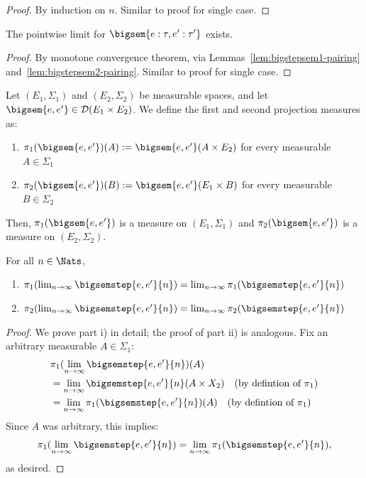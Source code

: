 \begin{proof}
	By induction on $n$. Similar to proof for single case.
\end{proof}

\begin{lemma}\label{lem:limit-exists-2}
	The pointwise limit for $\bigsem{e : \tau, e' : \tau'}$ exists.
\end{lemma}

\begin{proof}
	By monotone convergence theorem, via Lemmas~\ref{lem:bigstepsem1-pairing} and~\ref{lem:bigstepsem2-pairing}. Similar to proof for single case.
\end{proof}

\begin{definition}
	Let $(E_1, \Sigma_1)$ and $(E_2, \Sigma_2)$ be measurable spaces, and let $\bigsem{e,e'} \in \mathcal{D}(E_1 \times E_2)$. We define the first and second projection measures as:
	\begin{enumerate}
		\item $\pi_1(\bigsem{e,e'})(A) := \bigsem{e,e'}(A \times E_2)$ for every measurable $A \in \Sigma_1$
		\item $\pi_2(\bigsem{e,e'})(B) := \bigsem{e,e'}(E_1 \times B)$ for every measurable $B \in \Sigma_2$
	\end{enumerate}
	Then, $\pi_1(\bigsem{e,e'})$ is a measure on $(E_1, \Sigma_1)$ and $\pi_2(\bigsem{e,e'})$ is a measure on $(E_2, \Sigma_2)$.
\end{definition}

\begin{lemma}
	For all $n \in \Nats$,
	\begin{enumerate}
		\item $\pi_1(\lim_{n \to \infty} \bigsemstep{e,e'}{n}) = \lim_{n \to \infty} \pi_1(\bigsemstep{e,e'}{n})$
		\item $\pi_2(\lim_{n \to \infty} \bigsemstep{e,e'}{n}) = \lim_{n \to \infty} \pi_2(\bigsemstep{e,e'}{n})$ 
	\end{enumerate}
\end{lemma}

\begin{proof}
	We prove part i) in detail; the proof of part ii) is analogous. Fix an arbitrary measurable $A \in \Sigma_1$:
	\begin{align*}
		&\pi_1(\lim_{n \to \infty} \bigsemstep{e,e'}{n})(A) \\
		&= \lim_{n \to \infty} \bigsemstep{e,e'}{n}(A \times X_2) \quad \text{(by defintion of $\pi_1$)}\\
		&= \lim_{n \to \infty} \pi_1(\bigsemstep{e,e'}{n})(A) \quad \text{(by defintion of $\pi_1$)}
	\end{align*}
	Since $A$ was arbitrary, this implies:
	\[
		\pi_1(\lim_{n \to \infty} \bigsemstep{e,e'}{n}) =  \lim_{n \to \infty} \pi_1(\bigsemstep{e,e'}{n}),
	\]
	as desired.
\end{proof}

